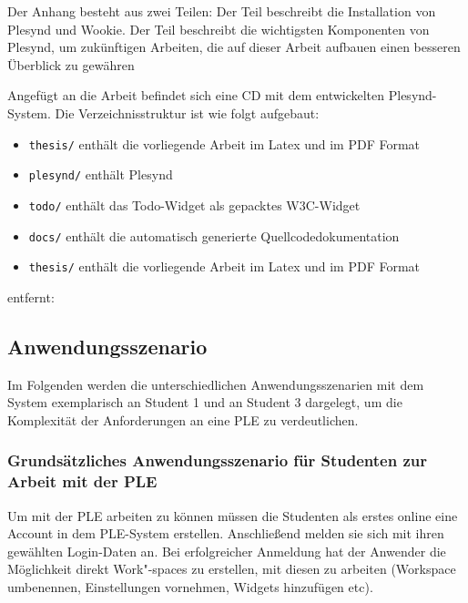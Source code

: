 \label{AppendixA}

Der Anhang besteht aus zwei Teilen: Der Teil  beschreibt die Installation von Plesynd und Wookie. Der Teil  beschreibt die wichtigsten Komponenten von Plesynd, um zukünftigen Arbeiten, die auf dieser Arbeit aufbauen einen besseren Überblick zu gewähren

Angefügt an die Arbeit befindet sich eine CD mit dem entwickelten Plesynd-System. Die Verzeichnisstruktur ist wie folgt aufgebaut:
\begin{itemize}
 \item \texttt{thesis/} enthält die vorliegende Arbeit im Latex und im PDF Format
 \item \texttt{plesynd/} enthält Plesynd
 \item \texttt{todo/} enthält das Todo-Widget als gepacktes W3C-Widget
 \item \texttt{docs/} enthält die automatisch generierte Quellcodedokumentation
 \item \texttt{thesis/} enthält die vorliegende Arbeit im Latex und im PDF Format
\end{itemize}


entfernt:


\subsection{Anwendungsszenario}
Im Folgenden werden die unterschiedlichen Anwendungsszenarien mit dem System exemplarisch an Student 1 und an Student 3 dargelegt, um die Komplexität der Anforderungen an eine PLE zu verdeutlichen.

\subsubsection*{Grundsätzliches Anwendungsszenario für Studenten zur Arbeit mit der PLE}
Um mit der PLE arbeiten zu können müssen die Studenten als erstes online eine Account in dem PLE-System erstellen. Anschließend melden sie sich mit ihren gewählten Login-Daten an. Bei erfolgreicher Anmeldung hat der Anwender die Möglichkeit direkt Work"-spaces zu erstellen, mit diesen zu arbeiten (Workspace umbenennen, Einstellungen vornehmen, Widgets hinzufügen etc).

